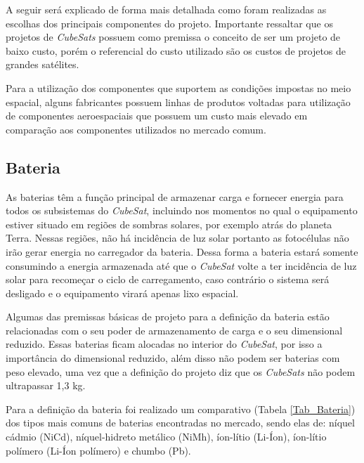 \documentclass[
	12pt,				%
	openright,			%
	oneside,			%
	a4paper,			%
	english,			%
	french,				%
	spanish,			%
	brazil,				%
	oldfontcommands
	]{abntex2}
\begin{document}
	A seguir será explicado de forma mais detalhada como foram realizadas as escolhas dos principais componentes do projeto. Importante ressaltar que os projetos de \textit{CubeSats} possuem como premissa o conceito de ser um projeto de baixo custo, porém o referencial do custo utilizado são os custos de projetos de grandes satélites.
	
	Para a utilização dos componentes que suportem as condições impostas  no meio espacial, alguns fabricantes possuem linhas de produtos voltadas para utilização de componentes aeroespaciais que possuem um custo mais elevado em comparação aos componentes utilizados no mercado comum.

\subsection[Bateria]{Bateria}

	
	As baterias têm a função principal de armazenar carga e fornecer energia para todos os subsistemas do \textit{CubeSat}, incluindo nos momentos no qual o equipamento estiver situado em regiões de sombras solares, por exemplo atrás do planeta Terra. Nessas regiões, não há incidência de luz solar portanto as fotocélulas não irão gerar energia no carregador da bateria. Dessa forma a bateria estará somente consumindo a energia armazenada até que o \textit{CubeSat} volte a ter incidência de luz solar para recomeçar o ciclo de carregamento, caso contrário o sistema será desligado e o equipamento virará apenas lixo espacial.	
	
	Algumas das premissas básicas de projeto para a definição da bateria estão relacionadas com o seu poder de armazenamento de carga e o seu dimensional reduzido. Essas baterias ficam alocadas no interior do \textit{CubeSat}, por isso a importância do dimensional reduzido, além disso não podem ser baterias com peso elevado, uma vez que a definição do projeto diz que os \textit{CubeSats} não podem ultrapassar 1,3 kg.
	
	Para a definição da bateria foi realizado um comparativo (Tabela \ref{Tab_Bateria}) dos tipos mais comuns de baterias encontradas no mercado, sendo elas de: níquel cádmio (NiCd), níquel-hidreto metálico (NiMh), íon-lítio (Li-Íon), íon-lítio polímero (Li-Íon polímero) e chumbo (Pb).
		
\end{document}
